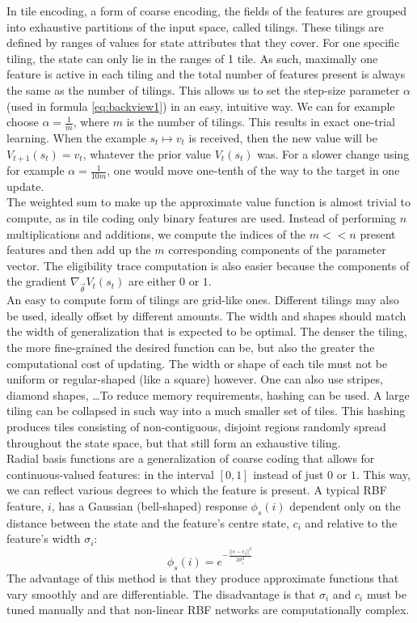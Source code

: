 \documentclass[a4paper, 11pt]{article}
\begin{document}
In tile encoding, a form of coarse encoding, the fields of the features are grouped into exhaustive partitions of the input space, called tilings. These tilings are defined by ranges of values for state attributes that they cover. For one specific tiling, the state can only lie in the ranges of 1 tile. As such, maximally one feature is active in each tiling and the total number of features present is always the same as the number of tilings. This allows us to set the step-size parameter $\alpha$ (used in formula \ref{eq:backview1}) in an easy, intuitive way. We can for example choose $\alpha = \frac{1}{m}$, where $m$ is the number of tilings. This results in exact one-trial learning. When the example $s_t \mapsto v_t$ is received, then the new value will be $V_{t+1}(s_t) = v_t$, whatever the prior value $V_t(s_t)$ was. For a slower change using for example $\alpha=\frac{1}{10m}$, one would move one-tenth of the way to the target in one update.\\
The weighted sum to make up the approximate value function is almost trivial to compute, as in tile coding only binary features are used. Instead of performing $n$ multiplications and additions, we compute the indices of the $m<<n$ present features and then add up the $m$ corresponding components of the parameter vector. The eligibility trace computation is also easier because the components of the gradient $\nabla_{\overrightarrow{\theta}} V_t(s_t)$ are either $0$ or $1$.\\
An easy to compute form of tilings are grid-like ones. Different tilings may also be used, ideally offset by different amounts. The width and shapes should match the width of generalization that is expected to be optimal. The denser the tiling, the more fine-grained the desired function can be, but also the greater the computational cost of updating. The width or shape of each tile must not be uniform or regular-shaped (like a square) however. One can also use stripes, diamond shapes, \dots To reduce memory requirements, hashing can be used. A large tiling can be collapsed in such way into a much smaller set of tiles. This hashing produces tiles consisting of non-contiguous, disjoint regions randomly spread throughout the state space, but that still form an exhaustive tiling.\\
Radial basis functions are a generalization of coarse coding that allows for continuous-valued features: in the interval $[0,1]$ instead of just $0$ or $1$. This way, we can reflect various degrees to which the feature is present. A typical RBF feature, $i$, has a Gaussian (bell-shaped) response $\phi_s(i)$ dependent only on the distance between the state and the feature's centre state, $c_i$ and relative to the feature's width $\sigma_i$:
\begin{equation}
\phi_s(i) = e^{-\frac{||s-c_i||^2}{2 \sigma^2_i}}
\end{equation}
The advantage of this method is that they produce approximate functions that vary smoothly and are differentiable. The disadvantage is that $\sigma_i$ and $c_i$ must be tuned manually and that non-linear RBF networks are computationally complex.\\
\end{document}
